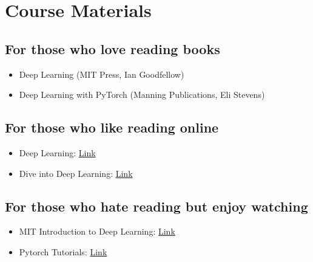 \documentclass[
]{book}
\begin{document}
\hypertarget{course-materials}{%
\chapter{Course Materials}\label{course-materials}}

\hypertarget{for-those-who-love-reading-books}{%
\section*{For those who love reading books}\label{for-those-who-love-reading-books}}

\begin{itemize}
\item
  Deep Learning (MIT Press, Ian Goodfellow)
\item
  Deep Learning with PyTorch (Manning Publications, Eli Stevens)
\end{itemize}

\hypertarget{for-those-who-like-reading-online}{%
\section*{For those who like reading online}\label{for-those-who-like-reading-online}}

\begin{itemize}
\item
  Deep Learning: \href{https://www.deeplearningbook.org/}{Link}
\item
  Dive into Deep Learning: \href{https://d2l.ai/}{Link}
\end{itemize}

\hypertarget{for-those-who-hate-reading-but-enjoy-watching}{%
\section*{For those who hate reading but enjoy watching}\label{for-those-who-hate-reading-but-enjoy-watching}}

\begin{itemize}
\item
  MIT Introduction to Deep Learning: \href{https://youtube.com/playlist?list=PLtBw6njQRU-rwp5__7C0oIVt26ZgjG9NI\&si=a3Q8VooQY0cLYOBZ}{Link}
\item
  Pytorch Tutorials: \href{https://youtube.com/playlist?list=PLhhyoLH6IjfxeoooqP9rhU3HJIAVAJ3Vz\&si=423lXjNwU2B5dxaC}{Link}
\end{itemize}
\end{document}
